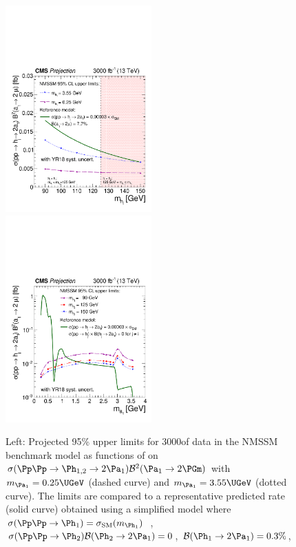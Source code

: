 \begin{figure}
\includegraphics[width=0.5\textwidth]{plots/nmssm_plots_scenario_2/CSxBR_NMSSM_vs_mh_3000.pdf}
\includegraphics[width=0.5\textwidth, clip, trim=0cm 0cm 0cm 0cm]{plots/nmssm_plots_scenario_2/CSxBR_vs_ma_3000.pdf}
\caption{Left: Projected 95\% \CL upper limits for 3000\fbinv of data in the NMSSM benchmark model as functions of \MPhOneTwo on ${\sigma(\Pp\Pp \to \PhOneTwo \to 2 \PaOne) \mathcal{B}^2(\PaOne \to 2 \PGm)}$ with $\MPaOne=0.25\UGeV$ (dashed curve)
and $\MPaOne=3.55\UGeV$ (dotted curve).
The limits are compared to a representative predicted rate (solid curve) obtained using a simplified model where
$\sigma (\Pp\Pp \to \PhOne)=\sigma_\mathrm{SM}(\MPhOne)$~\cite{Dittmaier:2011ti},
${\sigma (\Pp\Pp \to \PhTwo) \mathcal{B}(\PhTwo \to 2 \PaOne) = 0}$, $\mathcal{B}(\PhOne \to 2 \PaOne) = 0.3\%$,
}
\end{figure}
